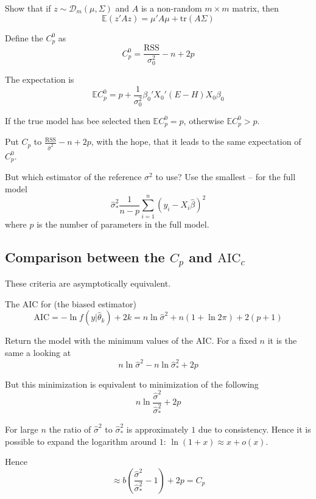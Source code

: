 \documentclass[a4paper]{article}
\newcommand{\brac}[1]{{\left ( #1 \right )}}
\newcommand{\induc}[1]{{\left . #1 \right \vert}}
\newcommand{\Dcal}{\mathcal{D}}
\newcommand{\ex}{\mathbb{E}}
\newcommand{\RSS}{\text{RSS}}
\newcommand{\tr}{\text{tr}}
\begin{document}
Show that if $z\sim \Dcal_m\brac{\mu,\Sigma}$ and $A$ is a non-random $m\times m$ matrix, then
\[\ex\brac{z'Az} = \mu'A\mu + \tr\brac{A\Sigma}\] 

Define the $C_p^0$ as
\[C_p^0 = \frac{\RSS}{\sigma^2_0} - n + 2p\]

The expectation is 
\[\ex C_p^0 = p + \frac{1}{\sigma^2_0} \beta_0'X_0' \brac{E-H} X_0\beta_0\]

If the true model has bee selected then $\ex C_p^0 = p$, otherwise $\ex C_p^0 > p$.

Put $C_p$ to $\frac{\RSS}{\hat{\sigma}^2} - n + 2p$, with the hope, that it leads to the same expectation of $C_p^0$.

But which estimator of the reference $\sigma^2$ to use? Use the smallest -- for the full model
\[\hat{\sigma}^2_*\frac{1}{n-p} \sum_{i=1}^n\brac{y_i - X_i\hat{\beta}}^2\]
where $p$ is the number of parameters in the full model.


\subsection{Comparison between the $C_p$ and $\text{AIC}_c$} %
\label{sub:comparison_between_cp_and_aicc}

These criteria are asymptotically equivalent.

The AIC for (the biased estimator)
\[\text{AIC} = - \ln f\brac{\induc{y}\hat{\theta}_k} + 2k 
	= n \ln \hat{\sigma}^2 + n\brac{1 + \ln 2\pi} + 2(p+1)\]

Return the model with the minimum values of the AIC. For a fixed $n$ it is the same a looking at 
\[n\ln \hat{\sigma}^2 - n\ln \hat{\sigma}^2_* + 2 p \]

But this minimization is equivalent to minimization of the following 
\[ n\ln \frac{\hat{\sigma}^2}{\hat{\sigma}^2_*} + 2p\]

For large $n$ the ratio of $\hat{\sigma}^2$ to $\hat{\sigma}^2_*$ is approximately $1$ due to consistency.
Hence it is possible to expand the logarithm around $1$: $\ln(1+x)\approx x + o(x)$.

Hence
\[\approx b\brac{\frac{\hat{\sigma}^2}{\hat{\sigma}^2_*} - 1} + 2p = C_p\]
\end{document}
